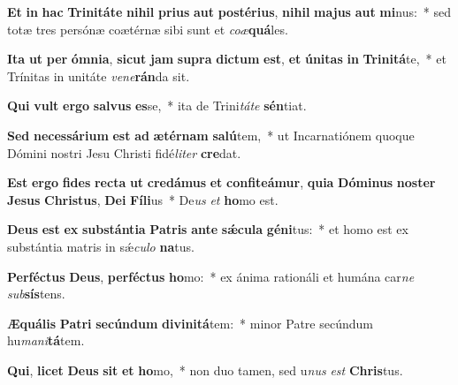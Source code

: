 \item \textbf{Et} \textbf{in} \textbf{hac} \textbf{Tri}\textbf{ni}\textbf{tá}\textbf{te} \textbf{ni}\textbf{hil} \textbf{pri}\textbf{us} \textbf{aut} \textbf{post}\textbf{é}\textbf{ri}\textbf{us}, \textbf{ni}\textbf{hil} \textbf{ma}\textbf{jus} \textbf{aut} \textbf{mi}nus:~* sed totæ tres persónæ coætérnæ sibi sunt et \textit{co}\textit{æ}\textbf{quá}les.
\item \textbf{I}\textbf{ta} \textbf{ut} \textbf{per} \textbf{óm}\textbf{ni}\textbf{a}, \textbf{sic}\textbf{ut} \textbf{jam} \textbf{su}\textbf{pra} \textbf{dic}\textbf{tum} \textbf{est}, \textbf{et} \textbf{ú}\textbf{ni}\textbf{tas} \textbf{in} \textbf{Tri}\textbf{ni}\textbf{tá}te,~* et Trínitas in unitáte \textit{ve}\textit{ne}\textbf{rán}da sit.
\item \textbf{Qui} \textbf{vult} \textbf{er}\textbf{go} \textbf{sal}\textbf{vus} \textbf{es}se,~* ita de Trini\textit{tá}\textit{te} \textbf{sén}tiat.
\item \textbf{Sed} \textbf{ne}\textbf{ces}\textbf{sá}\textbf{ri}\textbf{um} \textbf{est} \textbf{ad} \textbf{æ}\textbf{tér}\textbf{nam} \textbf{sa}\textbf{lú}tem,~* ut Incarnatiónem quoque Dómini nostri Jesu Christi fidé\textit{li}\textit{ter} \textbf{cre}dat.
\item \textbf{Est} \textbf{er}\textbf{go} \textbf{fi}\textbf{des} \textbf{rec}\textbf{ta} \textbf{ut} \textbf{cre}\textbf{dá}\textbf{mus} \textbf{et} \textbf{con}\textbf{fi}\textbf{te}\textbf{á}\textbf{mur}, \textbf{qui}\textbf{a} \textbf{Dó}\textbf{mi}\textbf{nus} \textbf{nos}\textbf{ter} \textbf{Je}\textbf{sus} \textbf{Chris}\textbf{tus}, \textbf{De}\textbf{i} \textbf{Fí}\textbf{li}us~* De\textit{us} \textit{et} \textbf{ho}mo est.
\item \textbf{De}\textbf{us} \textbf{est} \textbf{ex} \textbf{sub}\textbf{stán}\textbf{ti}\textbf{a} \textbf{Pa}\textbf{tris} \textbf{an}\textbf{te} \textbf{sǽ}\textbf{cu}\textbf{la} \textbf{gé}\textbf{ni}tus:~* et homo est ex substántia matris in sǽ\textit{cu}\textit{lo} \textbf{na}tus.
\item \textbf{Per}\textbf{féc}\textbf{tus} \textbf{De}\textbf{us}, \textbf{per}\textbf{féc}\textbf{tus} \textbf{ho}mo:~* ex ánima rationáli et humána car\textit{ne} \textit{sub}\textbf{sís}tens.
\item \textbf{Æ}\textbf{quá}\textbf{lis} \textbf{Pa}\textbf{tri} \textbf{se}\textbf{cún}\textbf{dum} \textbf{di}\textbf{vi}\textbf{ni}\textbf{tá}tem:~* minor Patre secúndum hu\textit{ma}\textit{ni}\textbf{tá}tem.
\item \textbf{Qui}, \textbf{li}\textbf{cet} \textbf{De}\textbf{us} \textbf{sit} \textbf{et} \textbf{ho}mo,~* non duo tamen, sed u\textit{nus} \textit{est} \textbf{Chris}tus.
